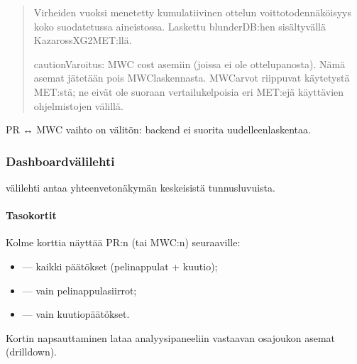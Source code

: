 \documentclass[letterpaper,10pt,finnish]{sphinxmanual}
\begin{document}
\sphinxAtStartPar
{}
\begin{quote}

\sphinxAtStartPar
Virheiden vuoksi menetetty kumulatiivinen ottelun voittotodennäköisyys koko suodatetussa aineistossa. Laskettu blunderDB:hen sisältyvällä Kazaross\sphinxhyphen{}XG2\sphinxhyphen{}MET:llä.

\begin{sphinxadmonition}{caution}{Varoitus:}
\sphinxAtStartPar
MWC cost   \sphinxhyphen{}asemiin (joissa ei ole ottelupanosta). Nämä asemat jätetään pois MWC\sphinxhyphen{}laskennasta. MWC\sphinxhyphen{}arvot riippuvat käytetystä MET:stä; ne eivät ole suoraan vertailukelpoisia eri MET:ejä käyttävien ohjelmistojen välillä.
\end{sphinxadmonition}
\end{quote}

\sphinxAtStartPar
PR ↔ MWC \sphinxhyphen{}vaihto on välitön: backend ei suorita uudelleenlaskentaa.


\subsubsection{Dashboard\sphinxhyphen{}välilehti}
\label{\detokenize{manuel:onglet-dashboard}}
\sphinxAtStartPar
{}\sphinxhyphen{}välilehti antaa yhteenvetonäkymän keskeisistä tunnusluvuista.


\paragraph{Tasokortit}
\label{\detokenize{manuel:cartes-de-niveau}}
\sphinxAtStartPar
Kolme korttia näyttää PR:n (tai MWC:n) seuraaville:
\begin{itemize}
\item {} 
\sphinxAtStartPar
{} — kaikki päätökset (pelinappulat + kuutio);

\item {} 
\sphinxAtStartPar
{} — vain pelinappulasiirrot;

\item {} 
\sphinxAtStartPar
{} — vain kuutiopäätökset.

\end{itemize}

\sphinxAtStartPar
Kortin napsauttaminen lataa analyysipaneeliin vastaavan osajoukon asemat (drill\sphinxhyphen{}down).
\end{document}
